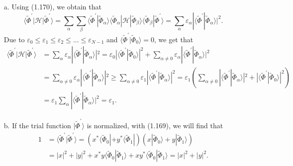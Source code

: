 \documentclass[a4paper]{book}
\newcounter{solution}[chapter]
\newcounter{eqs}[solution]
\begin{document}
	\begin{solution}
	
	\begin{enumerate}
	\item[a.] Using (1.170), we obtain that
	\begin{equation*}
		\langle \tilde{\Phi}^\prime | \mathscr{H} | \tilde{\Phi}^\prime \rangle = \sum_\alpha \sum_\beta \langle \tilde{\Phi}^\prime | \tilde{\Phi}_\alpha \rangle \langle \tilde{\Phi}_\alpha |\mathscr{H} | \tilde{\Phi}_\beta \rangle \langle \tilde{\Phi}_\beta | \tilde{\Phi}^\prime \rangle = \sum_\alpha \varepsilon_\alpha | \langle \tilde{\Phi}^\prime | \tilde{\Phi}_\alpha \rangle |^2 .
	\end{equation*}
	Due to $\varepsilon_0 \leqslant \varepsilon_1 \leqslant \varepsilon_2 \leqslant ... \leqslant \varepsilon_{N - 1}$ and $\langle \tilde{\Phi}^\prime | \tilde{\Phi}_0 \rangle = 0$, we get that
	\begin{align*}
		\langle \tilde{\Phi}^\prime | \mathscr{H} | \tilde{\Phi}^\prime \rangle &= \sum_\alpha \varepsilon_\alpha | \langle \tilde{\Phi}^\prime | \tilde{\Phi}_\alpha \rangle |^2 = \varepsilon_0 | \langle \tilde{\Phi}^\prime | \tilde{\Phi}_0 \rangle |^2 + \sum_{\alpha \neq 0} \varepsilon_\alpha | \langle \tilde{\Phi}^\prime | \tilde{\Phi}_\alpha \rangle |^2 \\
		&= \sum_{\alpha \neq 0} \varepsilon_\alpha | \langle \tilde{\Phi}^\prime | \tilde{\Phi}_\alpha \rangle |^2 \geqslant \sum_{\alpha \neq 0} \varepsilon_1 | \langle \tilde{\Phi}^\prime | \tilde{\Phi}_\alpha \rangle |^2 = \varepsilon_1 \left( \sum_{\alpha \neq 0} | \langle \tilde{\Phi}^\prime | \tilde{\Phi}_\alpha \rangle |^2 + | \langle \tilde{\Phi}^\prime | \tilde{\Phi}_0 \rangle |^2 \right) \\
		&= \varepsilon_1 \sum_\alpha | \langle \tilde{\Phi}^\prime | \tilde{\Phi}_\alpha \rangle |^2 = \varepsilon_1 .
	\end{align*} %
			
	\item[b.] If the trial function $|\tilde{\Phi}^\prime \rangle$ is normalized, with (1.169), we will find that
	\begin{align*}
		1 &= \langle \tilde{\Phi}^\prime | \tilde{\Phi}^\prime \rangle = ( x^* \langle \tilde{\Phi}_0 | + y^* \langle \tilde{\Phi}_1 | ) ( x | \tilde{\Phi}_0 \rangle + y | \tilde{\Phi}_1 \rangle ) \\
		&= |x|^2 + |y|^2 + x^*y \langle \tilde{\Phi}_0 | \tilde{\Phi}_1 \rangle +  xy^* \langle \tilde{\Phi}_0 | \tilde{\Phi}_1 \rangle = |x|^2 + |y|^2.
	\end{align*}
				

\end{enumerate}
\end{solution}
\end{document}
